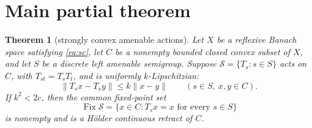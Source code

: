 \documentclass[11pt]{article}
\newtheorem{theorem}{Theorem}
\newcommand{\Fix}{\operatorname{Fix}}
\begin{document}
\section*{Main partial theorem}

\begin{theorem}[strongly convex amenable actions]\label{thm:main}
Let $X$ be a reflexive Banach space satisfying \eqref{eq:sc}, let $C$ be a
nonempty bounded closed convex subset of $X$, and let $S$ be a discrete left
amenable semigroup.  Suppose
$\mathcal S=\{T_s:s\in S\}$ acts on $C$, with
$T_{st}=T_sT_t$, and is uniformly $k$-Lipschitzian:
\[
 \|T_sx-T_sy\|\le k\|x-y\|
 \qquad(s\in S,\ x,y\in C).
\]
If $k^2<2c$, then the common fixed-point set
\[
 \Fix\mathcal S=\{x\in C:T_sx=x\text{ for every }s\in S\}
\]
is nonempty and is a H\"older continuous retract of $C$.
\end{theorem}
\end{document}
